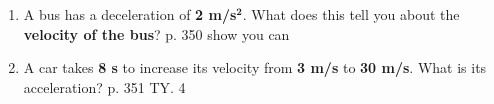 \documentclass[A4,12pt]{article}
\begin{document}
\begin{enumerate}[label=\bfseries (\arabic*)]
\item A bus has a deceleration of \textbf{2 m/s}$\bm{^2}$. 
What does this tell you about the \textbf{velocity of the bus}? \cite{CCEADA} p. 350 show you can
%
%













\item A car takes \textbf{8 s} to increase its velocity from \textbf{3 m/s} to \textbf{30 m/s}. What is its acceleration? \cite{CCEADA} p. 351 TY. 4
%
%



















\end{enumerate}
\end{document}
